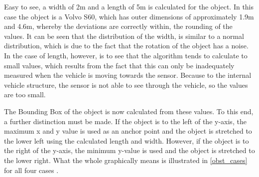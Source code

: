 \documentclass[11pt,oneside,openright]{mpreport}
\begin{document}

Easy to see, a width of 2m and a length of 5m is calculated for the object. In this case the object is a Volvo S60, which has outer dimensions of approximately
1.9m and 4.6m, whereby the deviations are correctly within, the rounding of the values. 
It can be seen that the distribution of the width, is similar to a normal distribution, which is due to the fact that the rotation of the object has a noise.
In the case of length, however, is to see that the algorithm tends to calculate to small values, which results from the fact that this can only be inadequately
measured when the vehicle is moving towards the sensor. Because to the internal vehicle structure, the sensor is not able to see through the vehicle, so the
values are too small.


The Bounding Box of the object is now calculated from these values. To this end, a further distinction must be made.
If the object is to the left of the y-axis, the maximum x and y value is used as an anchor point and the object is stretched to the lower left using the calculated length and width.
However, if the object is to the right of the y-axis, the minimum y-value is used and the object is stretched to the lower right. 
What the whole graphically means is illustrated in \cref{obst_cases} for all four cases .
\end{document}
